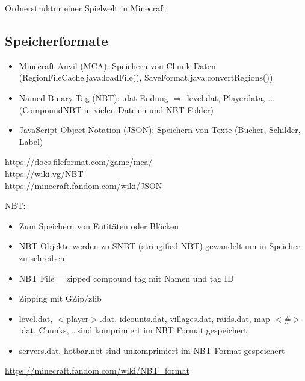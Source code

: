 \begin{listing}[htp]
    \caption{Ordnerstruktur einer Spielwelt in Minecraft\cite{minecraftFolderStruc}}
    \label{lst:ordnerStrukturMinecraft}
\end{listing}

\subsection{Speicherformate}
\begin{itemize}
    \item Minecraft Anvil (MCA): Speichern von Chunk Daten (RegionFileCache.java:loadFile(), SaveFormat.java:convertRegions())
    \item Named Binary Tag (NBT): .dat-Endung $\Rightarrow$ level.dat, Playerdata, ... (CompoundNBT in vielen Dateien und NBT Folder)
    \item JavaScript Object Notation (JSON): Speichern von Texte (Bücher, Schilder, Label)
\end{itemize}

\url{https://docs.fileformat.com/game/mca/}\\
\url{https://wiki.vg/NBT}\\
\url{https://minecraft.fandom.com/wiki/JSON}

NBT:
\begin{itemize}
    \item Zum Speichern von Entitäten oder Blöcken
    \item NBT Objekte werden zu SNBT (stringified NBT) gewandelt um in Speicher zu schreiben 
    \item NBT File = zipped compound tag mit Namen und tag ID 
    \item Zipping mit GZip/zlib
    \item level.dat, $<$player$>$.dat, idcounts.dat, villages.dat, raids.dat, map$\_$$<$\#$>$.dat, Chunks, \dots sind komprimiert im NBT Format gespeichert
    \item servers.dat, hotbar.nbt sind unkomprimiert im NBT Format gespeichert
\end{itemize}
\url{https://minecraft.fandom.com/wiki/NBT_format}

